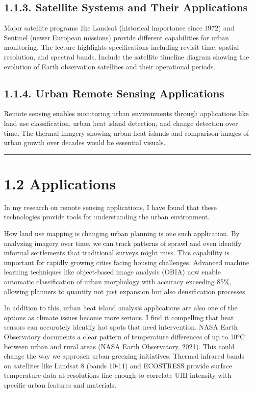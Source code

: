 \documentclass[
  letterpaper,
  DIV=11,
  numbers=noendperiod]{scrreprt}
\begin{document}
\subsection{1.1.3. Satellite Systems and Their
Applications}\label{satellite-systems-and-their-applications}

Major satellite programs like Landsat (historical importance since 1972)
and Sentinel (newer European missions) provide different capabilities
for urban monitoring. The lecture highlights specifications including
revisit time, spatial resolution, and spectral bands. Include the
satellite timeline diagram showing the evolution of Earth observation
satellites and their operational periods.

\subsection{1.1.4. Urban Remote Sensing
Applications}\label{urban-remote-sensing-applications}

Remote sensing enables monitoring urban environments through
applications like land use classification, urban heat island detection,
and change detection over time. The thermal imagery showing urban heat
islands and comparison images of urban growth over decades would be
essential visuals.

\begin{center}\rule{0.5\linewidth}{0.5pt}\end{center}

\section{1.2 Applications}\label{applications}

In my research on remote sensing applications, I have found that these
technologies provide tools for understanding the urban environment.

How land use mapping is changing urban planning is one such application.
By analyzing imagery over time, we can track patterns of sprawl and even
identify informal settlements that traditional surveys might miss. This
capability is important for rapidly growing cities facing housing
challenges. Advanced machine learning techniques like object-based image
analysis (OBIA) now enable automatic classification of urban morphology
with accuracy exceeding 85\%, allowing planners to quantify not just
expansion but also densification processes.

In addition to this, urban heat island analysis applications are also
one of the options as climate issues become more serious. I find it
compelling that heat sensors can accurately identify hot spots that need
intervention. NASA Earth Observatory documents a clear pattern of
temperature differences of up to 10°C between urban and rural areas
(NASA Earth Observatory, 2021). This could change the way we approach
urban greening initiatives. Thermal infrared bands on satellites like
Landsat 8 (bands 10-11) and ECOSTRESS provide surface temperature data
at resolutions fine enough to correlate UHI intensity with specific
urban features and materials.
\end{document}
